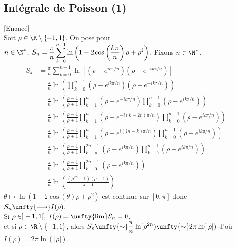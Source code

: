 \documentclass{book}
\begin{document}
	
	
	\subsection{Intégrale de Poisson (1) }\label{sec:integrale-de-poisson-1-etoile2}
	\textcolor{blue}{\hyperref[intpoisson1]{[Enoncé]}}\\
	Soit $\rho\in \R\setminus\{-1,1\}$. On pose pour $n\in \N^*,\ S_n=\displaystyle\frac{\pi}{n}\sum\limits_{k=0}^{n-1}\ln\left(1-2\cos\left(\frac{k\pi}{n}\right)\rho+\rho^2\right)$. Fixons $n\in \N^*$.\\
	\begin{align*}
		S_n&=\displaystyle\frac{\pi}{n}\sum\limits_{k=0}^{n-1}\ln\left[(\rho-e^{ik\pi/n})(\rho-e^{-ik\pi/n})\right]\\
		&=\displaystyle\frac{\pi}{n}\ln\left(\prod\limits_{k=0}^{n-1}(\rho-e^{ik\pi/n})(\rho-e^{-ik\pi/n})\right)\\
		&=\displaystyle\frac{\pi}{n}\ln\left(\frac{\rho-1}{\rho+1}\displaystyle\prod\limits_{k=1}^{n}(\rho-e^{-ik\pi/n})\prod\limits_{k=0}^{n-1}(\rho-e^{ik\pi/n})\right)\\
		&=\displaystyle\frac{\pi}{n}\ln\left(\frac{\rho-1}{\rho+1}\displaystyle\prod\limits_{k=1}^{n}(\rho-e^{-i(k-2n)\pi/n})\prod\limits_{k=0}^{n-1}(\rho-e^{ik\pi/n})\right)\\
		&=\displaystyle\frac{\pi}{n}\ln\left(\frac{\rho-1}{\rho+1}\displaystyle\prod\limits_{k=1}^{n}(\rho-e^{i(2n-k)\pi/n})\prod\limits_{k=0}^{n-1}(\rho-e^{ik\pi/n})\right)\\
		&=\displaystyle\frac{\pi}{n}\ln\left(\frac{\rho-1}{\rho+1}\displaystyle\prod\limits_{k=n}^{2n-1}(\rho-e^{ik\pi/n})\prod\limits_{k=0}^{n-1}(\rho-e^{ik\pi/n})\right)\\
		&=\displaystyle\frac{\pi}{n}\ln\left(\frac{\rho-1}{\rho+1}\prod\limits_{k=0}^{2n-1}(\rho-e^{ik\pi/n})\right)\\
		&=\displaystyle\frac{\pi}{n}\ln\left(\frac{(\rho^{2n}-1)(\rho-1)}{\rho+1}\right)
	\end{align*}
	$\theta\mapsto \ln(1-2\cos(\theta)\rho+\rho^2)$ est continue sur $[0,\pi]$ donc $S_n\unfty{\longrightarrow}I(\rho)$.\\
	Si $\rho\in ]-1,1[,\ I(\rho)=\unfty{\lim}S_n=0$,\\
	et si $\rho\in \R\setminus\{-1,1\}$, alors $S_n\unfty{\sim}\displaystyle\frac{\pi}{n}\ln(\rho^{2n})\unfty{\sim}2\pi\ln(|\rho|)$ d'où $I(\rho)=2\pi\ln(|\rho|)$.
	
\end{document}
